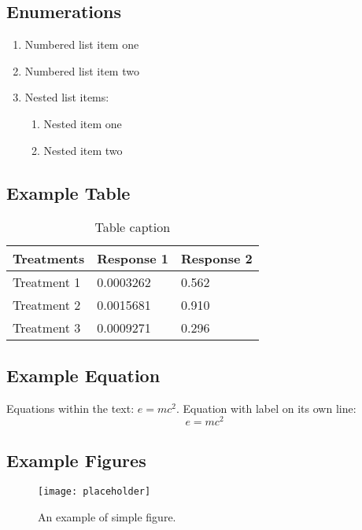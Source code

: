 \subsection*{Enumerations}
\begin{enumerate}
\item Numbered list item one
\item Numbered list item two
\item Nested list items:
\begin{enumerate}
\item Nested item one
\item Nested item two
\end{enumerate}
\end{enumerate}


\subsection*{Example Table}

\begin{table}[h] 
\centering
\begin{tabular}{l l l}
\hline
\textbf{Treatments} & \textbf{Response 1} & \textbf{Response 2}\\
\hline
Treatment 1 & 0.0003262 & 0.562 \\
Treatment 2 & 0.0015681 & 0.910 \\
Treatment 3 & 0.0009271 & 0.296 \\
\hline
\end{tabular}
\caption{Table caption}
\label{tab:example}
\end{table}



\subsection*{Example Equation}
Equations within the text: $e = mc^2$. Equation with label on its own line:
\begin{equation} \label{eq:emc}
    e = mc^2
\end{equation}




\subsection*{Example Figures}

\begin{figure}[ht]
    \centering\texttt{[image: placeholder]}
    \caption{An example of simple figure.}
    \label{fig:example}
\end{figure}

